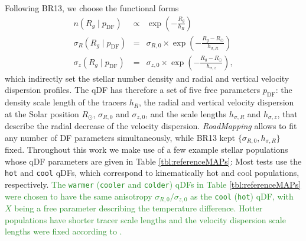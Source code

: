 \documentclass[iop,revtex4]{emulateapj}
\newcommand{\RM}{{\sl RoadMapping}}
\newcommand{\NEW}[1]{\textcolor{ForestGreen}{#1}}
\newcommand{\OLD}[1]{}
\begin{document}
Following BR13, we choose the functional forms
\begin{eqnarray}
n(R_g \mid p_\text{DF}) &\propto& \exp\left(-\frac{R_g}{h_R} \right)\\
\sigma_R(R_g \mid p_\text{DF}) &=& \sigma_{R,0} \times \exp\left(- \frac{R_g-R_\odot}{h_{\sigma,R}} \right)\label{eq:sigmaRRg}\\
\sigma_z(R_g \mid p_\text{DF}) &=& \sigma_{z,0} \times \exp\left(- \frac{R_g-R_\odot}{h_{\sigma,z}} \right)\label{eq:sigmazRg},
\end{eqnarray}
which indirectly set the stellar number density and radial and vertical velocity dispersion profiles. The qDF has therefore a set of five free parameters $p_\text{DF}$: the density scale length of the tracers $h_R$, the radial and vertical velocity dispersion at the Solar position $R_\odot$, $\sigma_{R,0}$ and $\sigma_{z,0}$, and the scale lengths $h_{\sigma,R}$ and $h_{\sigma,z}$, that describe the radial decrease of the velocity dispersion. \RM{} allows to fit any number of DF parameters simultaneously, while BR13 kept $\{\sigma_{R,0},h_{\sigma,R}\}$ fixed. Throughout this work we make use of a few example stellar populations whose qDF parameters are given in \OLD{in} Table \ref{tbl:referenceMAPs}: Most tests use the \texttt{hot} and \texttt{cool} qDFs, which correspond to kinematically hot and cool populations, respectively. \NEW{The \texttt{warmer} (\texttt{cooler} and \texttt{colder}) qDFs in Table \ref{tbl:referenceMAPs} were chosen to have the same anisotropy $\sigma_{R,0}/\sigma_{z,0}$ as the \texttt{cool} (\texttt{hot}) qDF, with $X$ being a free parameter describing the temperature difference. Hotter populations have shorter tracer scale lengths \citep{2012ApJ...753..148B} and the velocity dispersion scale lengths were fixed according to \citet{2012ApJ...755..115B}.}
\end{document}
